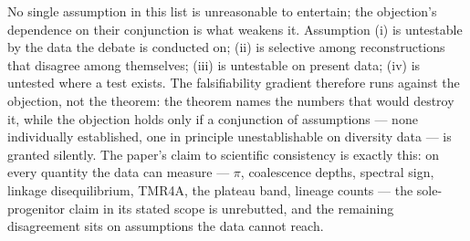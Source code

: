 No single assumption in this list is unreasonable to entertain; the
objection's dependence on their conjunction is what weakens it. Assumption
(i) is untestable by the data the debate is conducted on; (ii) is
selective among reconstructions that disagree among themselves; (iii) is
untestable on present data; (iv) is untested where a test exists. The
falsifiability gradient therefore runs against the objection, not the
theorem: the theorem names the numbers that would destroy it, while the
objection holds only if a conjunction of assumptions --- none
individually established, one in principle unestablishable on diversity
data --- is granted silently. The paper's claim to scientific consistency
is exactly this: on every quantity the data can measure --- $\pi$,
coalescence depths, spectral sign, linkage disequilibrium, TMR4A, the
plateau band, lineage counts --- the sole-progenitor claim in its stated
scope is unrebutted, and the remaining disagreement sits on assumptions
the data cannot reach.

